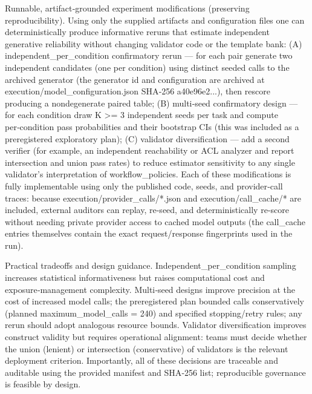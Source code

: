 \documentclass[conference]{IEEEtran}
\begin{document}
Runnable, artifact‑grounded experiment modifications (preserving reproducibility). Using only the supplied artifacts and configuration files one can deterministically produce informative reruns that estimate independent generative reliability without changing validator code or the template bank: (A) independent\_per\_condition confirmatory rerun --- for each pair generate two independent candidates (one per condition) using distinct seeded calls to the archived generator (the generator id and configuration are archived at execution/model\_configuration.json SHA‑256 a40e96e2...), then rescore producing a nondegenerate paired table; (B) multi‑seed confirmatory design --- for each condition draw K >= 3 independent seeds per task and compute per‑condition pass probabilities and their bootstrap CIs (this was included as a preregistered exploratory plan); (C) validator diversification --- add a second verifier (for example, an independent reachability or ACL analyzer and report intersection and union pass rates) to reduce estimator sensitivity to any single validator's interpretation of workflow\_policies. Each of these modifications is fully implementable using only the published code, seeds, and provider‑call traces: because execution/provider\_calls/*.json and execution/call\_cache/* are included, external auditors can replay, re-seed, and deterministically re-score without needing private provider access to cached model outputs (the call\_cache entries themselves contain the exact request/response fingerprints used in the run).

Practical tradeoffs and design guidance. Independent\_per\_condition sampling increases statistical informativeness but raises computational cost and exposure‑management complexity. Multi‑seed designs improve precision at the cost of increased model calls; the preregistered plan bounded calls conservatively (planned maximum\_model\_calls = 240) and specified stopping/retry rules; any rerun should adopt analogous resource bounds. Validator diversification improves construct validity but requires operational alignment: teams must decide whether the union (lenient) or intersection (conservative) of validators is the relevant deployment criterion. Importantly, all of these decisions are traceable and auditable using the provided manifest and SHA‑256 list; reproducible governance is feasible by design.
\end{document}
